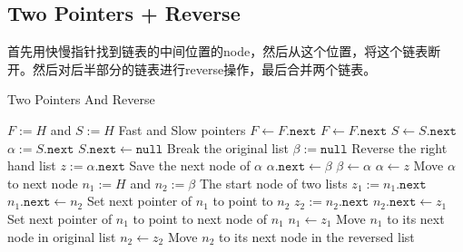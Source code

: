 \subsection{Two Pointers + Reverse}
首先用快慢指针找到链表的中间位置的node，然后从这个位置，将这个链表断开。然后对后半部分的链表进行reverse操作，最后合并两个链表。
\setcounter{algorithm}{0}
\begin{algorithm}[H]
\caption{Two Pointers And Reverse}
\begin{algorithmic}[1]
\State \Return
\EndIf
\State $F:=H$ and $S:=H$ \Comment Fast and Slow pointers
\State $F\gets F.\texttt{next}$
\State $F\gets F.\texttt{next}$
\State $S\gets S.\texttt{next}$
\EndWhile
\State $\alpha:=S.\texttt{next}$
\State $S.\texttt{next}\gets\texttt{null}$ \Comment Break the original list
\State $\beta:=\texttt{null}$
 \Comment Reverse the right hand list
\State $z:=\alpha.\texttt{next}$ \Comment Save the next node of $\alpha$
\State $\alpha.\texttt{next}\gets \beta$
\State $\beta\gets\alpha$ 
\State $\alpha\gets z$ \Comment Move $\alpha$ to next node
\EndWhile
\State $n_1:=H$ and $n_2:=\beta$ \Comment The start node of two lists
\State $z_1:=n_1.\texttt{next}$
\State $n_1.\texttt{next}\gets n_2$ \Comment Set next pointer of $n_1$ to point to $n_2$
\State $z_2:=n_2.\texttt{next}$
\State $n_2.\texttt{next}\gets z_1$ \Comment Set next pointer of $n_1$ to point to next node of $n_1$
\State $n_1\gets z_1$ \Comment Move $n_1$ to its next node in original list
\State $n_2\gets z_2$ \Comment Move $n_2$ to its next node in the reversed list
\EndWhile
\EndProcedure
\end{algorithmic}
\end{algorithm}